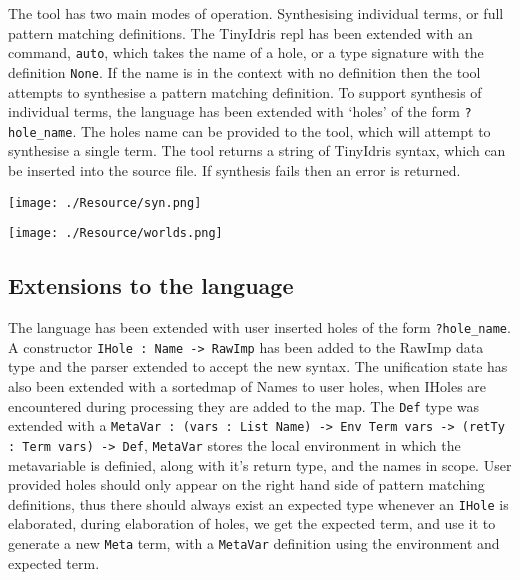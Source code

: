 \documentclass[a4paper]{article}
\newenvironment{Figure}
  {\par\medskip\noindent\minipage{\linewidth}}
  {\endminipage\par\medskip}
\begin{document}
The tool has two main modes of operation. Synthesising individual terms, or full pattern matching 
definitions. The TinyIdris repl has been extended with an command, \texttt{auto}, which takes the name of a hole, or a type signature with the definition \texttt{None}.
If the name is in the context with no definition then the tool attempts to synthesise a pattern matching definition. 
To support synthesis of individual terms, the language has been extended with `holes' of the form \texttt{?hole\_name}.
The holes name can be provided to the tool, which will attempt to synthesise a single term.
The tool returns a string of TinyIdris syntax, which can be
inserted into the source file. If synthesis fails then an error is returned. 

\begin{multicols}{2}
\begin{Figure}
\centering
\texttt{[image: ./Resource/syn.png]}
\end{Figure}

\begin{Figure}
\centering
\texttt{[image: ./Resource/worlds.png]}
\end{Figure}
\end{multicols}


\subsection{Extensions to the language}
\label{sec:org92a89c9}
The language has been extended with user inserted holes of the form \texttt{?hole\_name}. 
A constructor \texttt{IHole : Name -> RawImp} has been added to the RawImp 
data type and the parser extended to accept the new syntax. The 
unification state has also been extended with a sortedmap of Names
to user holes, when IHoles are encountered during processing they are 
added to the map. The \texttt{Def} type was extended with a 
\texttt{MetaVar : (vars : List Name) -> Env Term vars -> (retTy : Term vars) -> Def}, 
\texttt{MetaVar} stores the local environment in which the metavariable is 
definied, along with it's return type, and the names in scope.
User provided holes should only appear on the right hand side of 
pattern matching definitions, thus there should always exist an expected 
type whenever an \texttt{IHole} is elaborated, during elaboration of holes, we get
the expected term, and use it to generate a new \texttt{Meta} term, with a
\texttt{MetaVar} definition using the environment and expected term.
\end{document}
